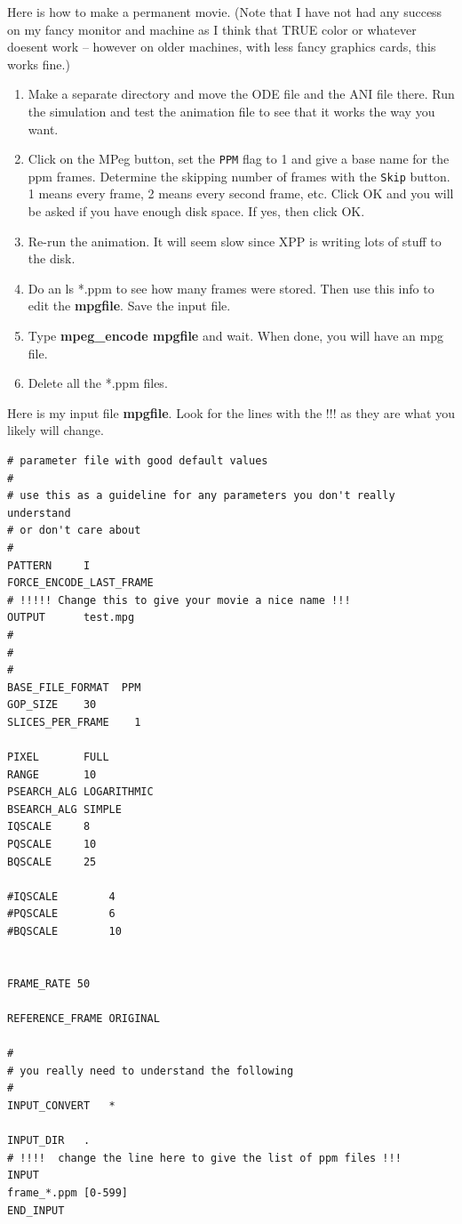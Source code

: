 \documentclass{article}
\begin{document}
Here is how to make a permanent movie. (Note that I have not had any
success on my fancy monitor and machine as I think that TRUE color or
whatever doesent work -- however on older machines, with less fancy
graphics cards, this works fine.)

\begin{enumerate}
\item Make a separate directory and move the ODE file and the ANI file
there. Run the simulation and test the animation file to see that it
works the way you want.
\item Click on the MPeg button, set the {\tt PPM} flag to 1 and give a
base name for the ppm frames.  Determine the skipping number of
frames with the {\tt Skip} button. 1 means every frame, 2 means every second frame, etc.  Click
OK and you will be asked if you have enough disk space. If yes, then
click OK. 
\item Re-run the animation. It will seem slow since XPP is writing
lots of stuff to the disk. 
\item Do an ls *.ppm  to see how many frames were stored. Then use
this info to edit the {\bf mpgfile}. Save the input file.
\item Type {\bf mpeg\_encode mpgfile} and wait. When done, you will
have an mpg file. 
\item Delete all the *.ppm files.
\end{enumerate}

Here is my input file {\bf mpgfile}. Look for the lines with the !!!
as they are what you likely will change.

\begin{verbatim}
# parameter file with good default values
#
# use this as a guideline for any parameters you don't really understand
# or don't care about
#
PATTERN		I
FORCE_ENCODE_LAST_FRAME
# !!!!! Change this to give your movie a nice name !!!
OUTPUT		test.mpg
#
# 
#
BASE_FILE_FORMAT  PPM
GOP_SIZE	30
SLICES_PER_FRAME	1

PIXEL		FULL
RANGE		10
PSEARCH_ALG	LOGARITHMIC
BSEARCH_ALG	SIMPLE
IQSCALE		8
PQSCALE		10
BQSCALE		25

#IQSCALE		4
#PQSCALE		6
#BQSCALE		10


FRAME_RATE 50

REFERENCE_FRAME	ORIGINAL

#
# you really need to understand the following
#
INPUT_CONVERT	*

INPUT_DIR	.
# !!!!  change the line here to give the list of ppm files !!!
INPUT
frame_*.ppm [0-599]
END_INPUT
\end{verbatim}
\end{document}

